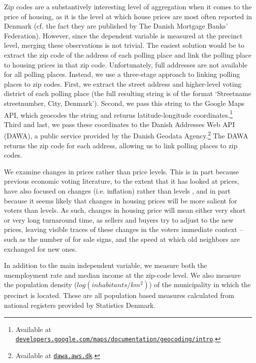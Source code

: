 \documentclass[12pt,a4paper]{article}
\begin{document}
Zip codes are a substantively interesting level of aggregation when it comes to the price of housing, as it is the level at which house prices are most often reported in Denmark (cf. the fact they are published by The Danish Mortgage Banks' Federation). However, since the dependent variable is measured at the precinct level, merging these observations is not trivial. The easiest solution would be to extract the zip code of the address of each polling place and link the polling place to housing prices in that zip code. Unfortunately, full addresses are not available for all polling places. Instead, we use a three-stage approach to linking polling places to zip codes. First, we extract the street address and higher-level voting district of each polling place (the full resulting string is of the format `Streetname streetnumber, City, Denmark'). Second, we pass this string to the Google Maps API, which geocodes the string and returns latitude-longitude coordinates.\footnote{Available at \texttt{\href{https://developers.google.com/maps/documentation/geocoding/intro}{developers.google.com/maps/documentation/geocoding/intro}}.} Third and last, we pass these coordinates to the Danish Addresses Web API (DAWA), a public service provided by the Danish Geodata Agency.\footnote{Available at \texttt{\href{http://dawa.aws.dk/}{dawa.aws.dk}}.} The DAWA returns the zip code for each address, allowing us to link polling places to zip codes. %

We examine changes in prices rather than price levels. This is in part because previous economic voting literature, to the extent that it has looked at prices, have also focused on changes (i.e. inflation) rather than levels \citep[cf.][]{kramer1971short}, and in part because it seems likely that changes in housing prices will be more salient for voters than levels. As such, changes in housing price will mean either very short or very long turnaround time, as sellers and buyers try to adjust to the new prices, leaving visible traces of these changes in the voters immediate context -- such as the number of for sale signs, and the speed at which old neighbors are exchanged for new ones.

In addition to the main independent variable, we measure both the unemployment rate and median income at the zip-code level. We also measure the population density ($log(inhabitants/km^2)$) of the municipality in which the precinct is located. These are all population based measures calculated from national registers provided by Statistics Denmark.
\end{document}
